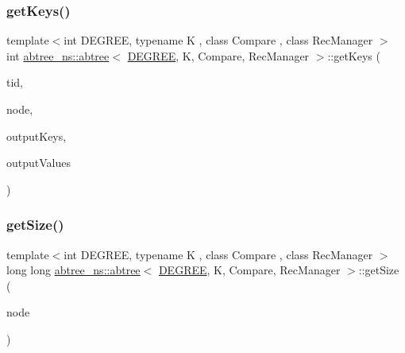 \mbox{\label{classabtree__ns_1_1abtree_a4cfae3349019ae80be93fc0806449250}} 
\subsubsection{\texorpdfstring{get\+Keys()}{getKeys()}}
{\footnotesize\ttfamily template$<$int D\+E\+G\+R\+EE, typename K , class Compare , class Rec\+Manager $>$ \\
int \hyperlink{classabtree__ns_1_1abtree}{abtree\+\_\+ns\+::abtree}$<$ \hyperlink{brown__sigouin__abtree__kcas_2adapter_8h_a5d88b17d70c985f2f2b8e987037fd6dd}{D\+E\+G\+R\+EE}, K, Compare, Rec\+Manager $>$\+::get\+Keys (\begin{DoxyParamCaption}\item[{const int}]{tid,  }\item[{\hyperlink{structabtree__ns_1_1Node}{Node}$<$ \hyperlink{brown__sigouin__abtree__kcas_2adapter_8h_a5d88b17d70c985f2f2b8e987037fd6dd}{D\+E\+G\+R\+EE}, K $>$ $\ast$}]{node,  }\item[{K $\ast$const}]{output\+Keys,  }\item[{void $\ast$$\ast$const}]{output\+Values }\end{DoxyParamCaption})\hspace{0.3cm}{\ttfamily [inline]}}

\mbox{\label{classabtree__ns_1_1abtree_a2da603531e2fbd1d4ed0f7dd869b419a}} 
\subsubsection{\texorpdfstring{get\+Size()}{getSize()}\hspace{0.1cm}{\footnotesize\ttfamily [1/4]}}
{\footnotesize\ttfamily template$<$int D\+E\+G\+R\+EE, typename K , class Compare , class Rec\+Manager $>$ \\
long long \hyperlink{classabtree__ns_1_1abtree}{abtree\+\_\+ns\+::abtree}$<$ \hyperlink{brown__sigouin__abtree__kcas_2adapter_8h_a5d88b17d70c985f2f2b8e987037fd6dd}{D\+E\+G\+R\+EE}, K, Compare, Rec\+Manager $>$\+::get\+Size (\begin{DoxyParamCaption}\item[{\hyperlink{structabtree__ns_1_1Node}{Node}$<$ \hyperlink{brown__sigouin__abtree__kcas_2adapter_8h_a5d88b17d70c985f2f2b8e987037fd6dd}{D\+E\+G\+R\+EE}, K $>$ $\ast$}]{node }\end{DoxyParamCaption})\hspace{0.3cm}{\ttfamily [inline]}}

